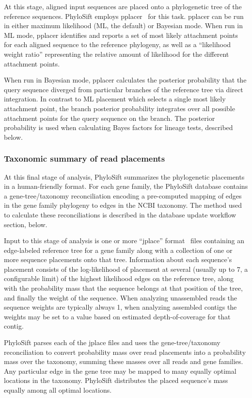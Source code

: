 \documentclass[10pt]{article}
\begin{document}
At this stage, aligned input sequences are placed onto a phylogenetic tree of the reference sequences.
PhyloSift employs pplacer~\cite{Matsen2010} for this task.
pplacer can be run in either maximum likelihood (ML, the default) or Bayesian mode.
When run in ML mode, pplacer identifies and reports a set of most likely attachment points for each aligned sequence to the reference phylogeny, as well as a ``likelihood weight ratio'' representing the relative amount of likelihood for the different attachment points.

When run in Bayesian mode, pplacer calculates the posterior probability that the query sequence diverged from particular branches of the reference tree via direct integration.
In contrast to ML placement which selects a single most likely attachment point, the branch posterior probability integrates over all possible attachment points for the query sequence on the branch.
The posterior probability is used when calculating Bayes factors for lineage tests, described below.

\subsubsection*{Taxonomic summary of read placements}
At this final stage of analysis, PhyloSift summarizes the phylogenetic placements in a human-friendly format.
For each gene family, the PhyloSift database contains a gene-tree/taxonomy reconciliation encoding a pre-computed mapping of edges in the gene family phylogeny to edges in the NCBI taxonomy. %
The method used to calculate these reconciliations is described in the database update workflow section, below.

Input to this stage of analysis is one or more ``jplace'' format~\cite{matsen2012format} files containing an edge-labeled reference tree for a gene family along with a collection of one or more sequence placements onto that tree.
Information about each sequence's placement consists of the log-likelihood of placement at several (usually up to 7, a configurable limit) of the highest likelihood edges on the reference tree, along with the probability mass that the sequence belongs at that position of the tree, and finally the weight of the sequence.
When analyzing unassembled reads the sequence weights are typically always 1, when analyzing assembled contigs the weights may be set to a value based on estimated depth-of-coverage for that contig.

PhyloSift parses each of the jplace files and uses the gene-tree/taxonomy reconciliation to convert probability mass over read placements into a probability mass over the taxonomy, summing these masses over all reads and gene families.
Any particular edge in the gene tree may be mapped to many equally optimal locations in the taxonomy.
PhyloSift distributes the placed sequence's mass equally among all optimal locations.
\end{document}
